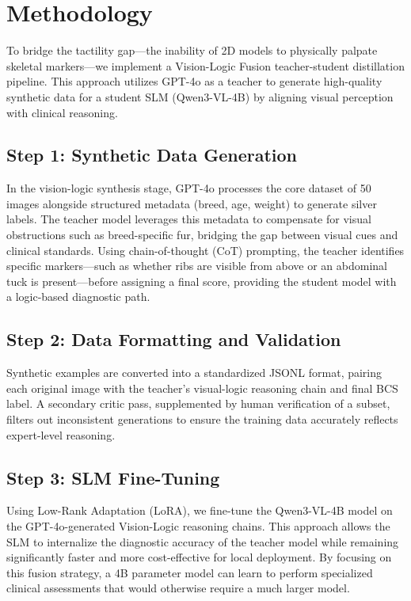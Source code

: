 \documentclass[11pt,twocolumn]{article}
\begin{document}
\section{Methodology}
To bridge the tactility gap---the inability of 2D models to physically palpate skeletal markers---we implement a Vision-Logic Fusion teacher-student distillation pipeline. This approach utilizes GPT-4o as a teacher to generate high-quality synthetic data for a student SLM (Qwen3-VL-4B) by aligning visual perception with clinical reasoning.

\subsection{Step 1: Synthetic Data Generation}
In the vision-logic synthesis stage, GPT-4o processes the core dataset of 50 images alongside structured metadata (breed, age, weight) to generate silver labels. The teacher model leverages this metadata to compensate for visual obstructions such as breed-specific fur, bridging the gap between visual cues and clinical standards. Using chain-of-thought (CoT) prompting, the teacher identifies specific markers---such as whether ribs are visible from above or an abdominal tuck is present---before assigning a final score, providing the student model with a logic-based diagnostic path.

\subsection{Step 2: Data Formatting and Validation}
Synthetic examples are converted into a standardized JSONL format, pairing each original image with the teacher's visual-logic reasoning chain and final BCS label. A secondary critic pass, supplemented by human verification of a subset, filters out inconsistent generations to ensure the training data accurately reflects expert-level reasoning.

\subsection{Step 3: SLM Fine-Tuning}
Using Low-Rank Adaptation (LoRA), we fine-tune the Qwen3-VL-4B model on the GPT-4o-generated Vision-Logic reasoning chains. This approach allows the SLM to internalize the diagnostic accuracy of the teacher model while remaining significantly faster and more cost-effective for local deployment. By focusing on this fusion strategy, a 4B parameter model can learn to perform specialized clinical assessments that would otherwise require a much larger model.
\end{document}
